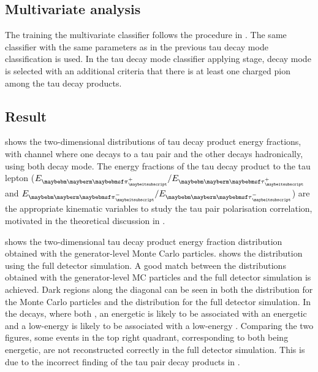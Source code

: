 \subsection{Multivariate analysis}

The training  the multivariate classifier follows the procedure in  . The same classifier with the same parameters as in the previous tau decay mode classification  is used.   In the tau decay mode classifier applying stage, \tauToPion decay mode is selected with an additional criteria that there is at least one charged pion among the tau decay products.

\subsection{Result}

 shows the two-dimensional distributions of  tau decay product energy fractions, with \eeZZ channel where one \PZ decays to a tau pair and the other \PZ decays hadronically, using both \tauToPion decay mode. The energy fractions of the tau decay product to the tau lepton ($E_{\Ppiplus} / E_{\APtauon}$ and $E_{\Ppiminus} / E_{\Ptauon}$) are the appropriate kinematic variables to study the tau pair polarisation correlation, motivated in the theoretical discussion in .

 shows the  two-dimensional  tau decay product energy fraction distribution obtained with the generator-level  Monte Carlo particles.  shows the distribution using the full detector simulation. A good match between the distributions obtained with  the generator-level  MC particles and the full detector simulation is achieved. Dark regions along the diagonal can be seen in both the distribution for the Monte Carlo particles and the distribution for the full detector simulation. In the \ZToTauTau decays, where both \tauToPion, an energetic \Pgppm is likely to be associated with an energetic \Pgpmp and a low-energy \Pgppm is  likely to be associated with a low-energy \Pgpmp. Comparing the two figures, some events in the top right quadrant, corresponding to  both \Ppipm being energetic, are not reconstructed correctly in the full detector simulation. This is due to the incorrect finding of the tau pair decay products  in .



